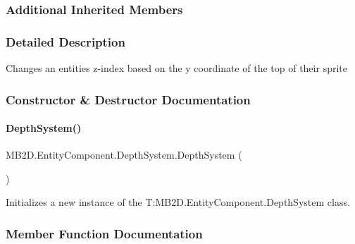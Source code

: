 \subsubsection*{Additional Inherited Members}


\subsubsection{Detailed Description}
Changes an entities z-\/index based on the y coordinate of the top of their sprite 



\subsubsection{Constructor \& Destructor Documentation}
\hypertarget{class_m_b2_d_1_1_entity_component_1_1_depth_system_a5a7f2fc4d65f99bb89624cbcd1d52d65}{}\label{class_m_b2_d_1_1_entity_component_1_1_depth_system_a5a7f2fc4d65f99bb89624cbcd1d52d65} 
\paragraph{\texorpdfstring{Depth\+System()}{DepthSystem()}}
{\footnotesize\ttfamily M\+B2\+D.\+Entity\+Component.\+Depth\+System.\+Depth\+System (\begin{DoxyParamCaption}{ }\end{DoxyParamCaption})\hspace{0.3cm}{\ttfamily [inline]}}



Initializes a new instance of the T\+:\+M\+B2\+D.\+Entity\+Component.\+Depth\+System class. 



\subsubsection{Member Function Documentation}
\hypertarget{class_m_b2_d_1_1_entity_component_1_1_depth_system_a738556bdf819c9c0d4082a323a502c58}{}\label{class_m_b2_d_1_1_entity_component_1_1_depth_system_a738556bdf819c9c0d4082a323a502c58} 
